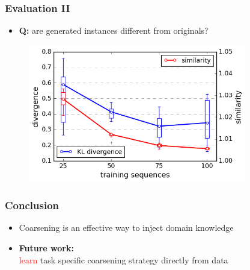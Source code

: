 \documentclass{beamer}
\newcommand{\red}[1]{\textcolor{red}{#1}}
\begin{document}
\begin{frame}
    \frametitle{Evaluation II}
    
    \begin{itemize}
        \item {\bf Q:} are generated instances different from originals?
    \end{itemize}
   \begin{figure}[ht]
        \centering
        \includegraphics[width=0.85\textwidth]{images/learningcurve.png}
    \end{figure}
\end{frame}

\begin{frame}
    \frametitle{Conclusion}
    
    \begin{itemize}
        \item Coarsening is an effective way to inject domain knowledge
        \item {\bf Future work:} \\\red{learn} task specific coarsening strategy directly from data   
    \end{itemize}

\end{frame}
\end{document}
